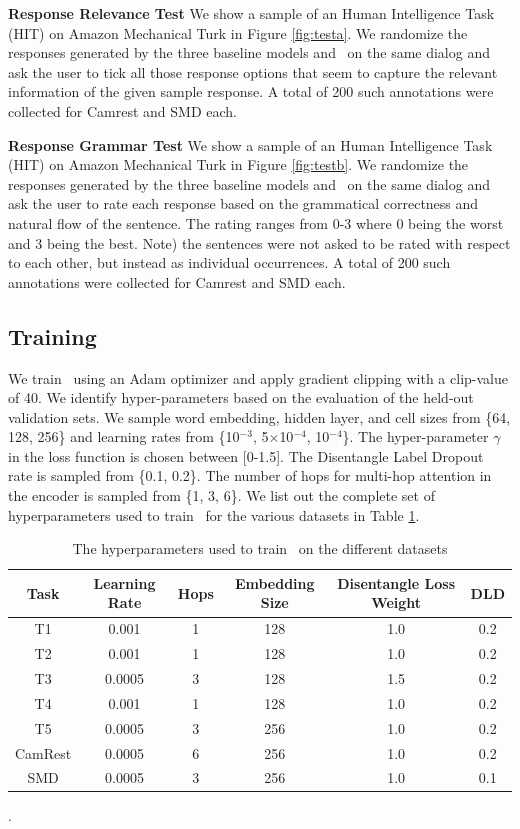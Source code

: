 \noindent \textbf{Response Relevance Test} 
We show a sample of an Human Intelligence Task (HIT) on Amazon Mechanical Turk in Figure \ref{fig:testa}. We randomize the responses generated by the three baseline models and \sys\ on the same dialog and ask the user to tick all those response options that seem to capture the relevant information of the given sample response. A total of 200 such annotations were collected for Camrest and SMD each.

\noindent \textbf{Response Grammar Test}
We show a sample of an Human Intelligence Task (HIT) on Amazon Mechanical Turk in Figure \ref{fig:testb}. We randomize the responses generated by the three baseline models and \sys\ on the same dialog and ask the user to rate each response based on the grammatical correctness and natural flow of the sentence. The rating ranges from 0-3 where 0 being the worst and 3 being the best. Note) the sentences were not asked to be rated with respect to each other, but instead as individual occurrences. A total of 200 such annotations were collected for Camrest and SMD each.

\subsection{Training}
We train \sys\ using an Adam optimizer \cite{kingma2014adam} and apply gradient clipping with a clip-value of 40. We identify hyper-parameters based on the evaluation of the held-out validation sets. We sample word embedding, hidden layer, and cell sizes from \{64, 128, 256\} and learning rates from \{10$^{-3}$, 5$\times$10$^{-4}$, 10$^{-4}$\}. The hyper-parameter $\gamma$ in the loss function is chosen between [0-1.5]. The Disentangle Label Dropout rate is sampled from \{0.1, 0.2\}. The number of hops for multi-hop attention in the encoder is sampled from \{1, 3, 6\}. 
We list out the complete set of hyperparameters used to train \sys\ for the various datasets in Table \ref{tab:params}. 

\begin{table}[ht]
\centering
\footnotesize
\begin{tabular}{c|ccccc}
\toprule
\textbf{Task} & \textbf{Learning Rate} & \textbf{Hops} &  \textbf{Embedding Size} & \textbf{Disentangle Loss Weight} & \textbf{DLD}\\
\midrule
T1 & 0.001 & 1 & 128 & 1.0 & 0.2 \\
T2 & 0.001 & 1 & 128 & 1.0 & 0.2 \\
T3 & 0.0005 & 3 & 128 & 1.5 & 0.2 \\
T4 & 0.001 & 1 & 128 & 1.0 & 0.2 \\
T5 & 0.0005 & 3 & 256 & 1.0 & 0.2 \\
CamRest & 0.0005 & 6 & 256 & 1.0 & 0.2 \\
SMD & 0.0005 & 3 & 256 & 1.0 & 0.1 \\
\bottomrule 
\end{tabular}
\caption{The hyperparameters used to train \sys\ on the different datasets}. 
\label{tab:params}
\end{table}



